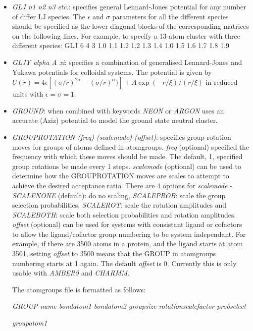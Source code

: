 \documentclass[12pt,a4paper,dvips]{article}
\begin{document}
\begin{itemize}
\item {\it GLJ n1 n2 n3 etc.}: specifies general Lennard-Jones potential for any number of
differ LJ species.
The $\epsilon$ and $\sigma$ parameters for all the different species should be specified as
the lower diagonal blocks of the corresponding matrices on the following lines.
For example, to specify a 13-atom cluster with three different species:
{\obeylines
GLJ 6 4 3
1.0
1.1 1.2 
1.2 1.3 1.4
1.0
1.5 1.6
1.7 1.8 1.9
}

\item {\it GLJY alpha A xi}: specifies a combination of generalised Lennard-Jones and Yukawa potentials for colloidal systems. 
The potential is given by $U(r) = 4\epsilon \left[ (\sigma/r)^{2\alpha} - (\sigma/r)^{\alpha}) \right] + A \exp(-r/\xi) / (r/\xi)$
in reduced units with $\epsilon = \sigma = 1$.

\item {\it GROUND\/}: when combined with keywords {\it NEON\/} or {\it ARGON\/}
uses an accurate (Aziz) potential to model the ground state neutral cluster.

\item {\it GROUPROTATION (freq) (scalemode) (offset)\/}: specifies group rotation moves for groups of atoms defined in {\rm atomgroups}. {\it freq\/} 
(optional) specified the frequency with which these moves should be made. The default, 1, specified group rotations be made every 1 steps. 
{\it scalemode\/} (optional) can be used to determine how the GROUPROTATION moves are scales to attempt to achieve the desired acceptance ratio.
There are 4 options for {\it scalemode} - {\it SCALENONE\/} (default): do no scaling, {\it SCALEPROB\/}: scale the group selection probabilities, {\it SCALEROT}: scale
the rotation amplitudes and {\it SCALEBOTH}: scale both selection probabilities and rotation amplitudes.
{\it offset\/} (optional) can be used for systems with consistant ligand or cofactors to allow the ligand/cofactor group numbering to be
system independant. For example, if there are 3500 atoms in a protein, and the ligand starts at atom 3501, setting {\it offset} to 3500 means
that the GROUP in {\textrm atomgroups} numbering starts at 1 again. The default {\it offset\/} is 0. Currently this is only usable with 
{\it AMBER9\/} and {\it CHARMM\/}.

The {\textrm atomgroups} file is formatted as follows:

{\it GROUP name bondatom1 bondatom2 groupsize rotationscalefactor probselect}

{\it groupatom1}


\end{itemize}
\end{document}
